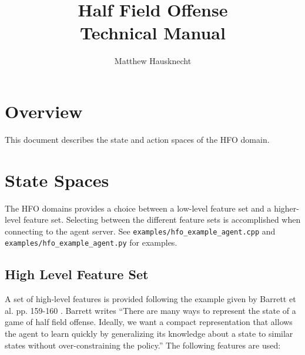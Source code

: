 \documentclass[12pt]{article}
\title{Half Field Offense \\ Technical Manual}
\author{Matthew Hausknecht}
\begin{document}
\maketitle
\tableofcontents

\section{Overview}

This document describes the state and action spaces of the HFO domain.

\section{State Spaces}

The HFO domains provides a choice between a low-level feature set and
a higher-level feature set. Selecting between the different feature
sets is accomplished when connecting to the agent server. See
\verb|examples/hfo_example_agent.cpp| and 
\verb|examples/hfo_example_agent.py| for examples.

\subsection{High Level Feature Set}
A set of high-level features is provided following the example given
by Barrett et al. pp. 159-160 \cite{THESIS14-Barrett}. Barrett writes
``There are many ways to represent the state of a game of half field
offense.  Ideally, we want a compact representation that allows the
agent to learn quickly by generalizing its knowledge about a state to
similar states without over-constraining the policy.'' The following
features are used:
\end{document}
